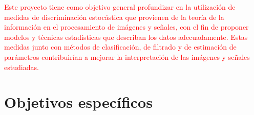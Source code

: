\documentclass[11pt]{article}
\begin{document}



\textcolor{red}{Este proyecto tiene como objetivo general profundizar en la utilización de medidas de discriminación estocástica que provienen de la teoría de la información en el procesamiento de imágenes y señales, con el fin de proponer modelos y técnicas estadísticas que describan los datos adecuadamente. Estas medidas junto con métodos de clasificación, de filtrado y de estimación de parámetros contribuirían a mejorar la interpretación de las imágenes y señales estudiadas.}


\section{Objetivos específicos}
\end{document}
